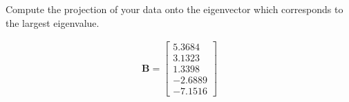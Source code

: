 Compute the projection of your data onto the eigenvector which corresponds to the largest eigenvalue.

\begin{solution}
    \begin{align*}
        \boldsymbol{B} = \begin{bmatrix}
            5.3684 \\
            3.1323 \\
            1.3398 \\
            -2.6889 \\
            -7.1516
        \end{bmatrix}
    \end{align*}
\end{solution}